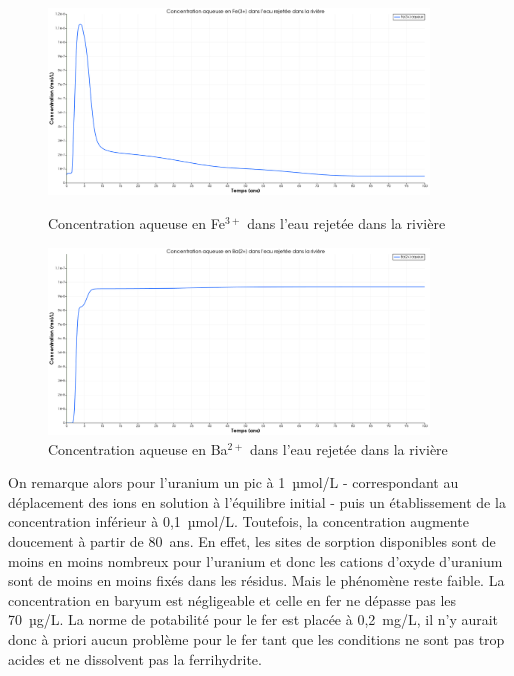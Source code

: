 \documentclass{article}
\begin{document}
\begin{figure}[H]
    \centering
    \begin{minipage}{0.5\textwidth}
        \centering
        \includegraphics[width=0.9\textwidth]{III_B_2_7.png} 
        \caption{Concentration aqueuse en Fe$^{3+}$ dans l'eau rejetée dans la rivière}
        \label{fig:Fe_riviere_sable_Base}
    \end{minipage}\hfill
    \begin{minipage}{0.5\textwidth}
        \centering
        \includegraphics[width=0.9\textwidth]{III_B_2_8.png} 
        \caption{Concentration aqueuse en Ba$^{2+}$ dans l'eau rejetée dans la rivière}
        \label{fig:Ba_riviere_sable_base}
    \end{minipage}
\end{figure}


On remarque alors pour l’uranium un pic à 1~µmol/L - correspondant au déplacement des ions en solution à l’équilibre initial - puis un établissement de la concentration inférieur à 0,1~µmol/L. Toutefois, la concentration augmente doucement à partir de 80~ans. En effet, les sites de sorption disponibles sont de moins en moins nombreux pour l'uranium et donc les cations d’oxyde d’uranium sont de moins en moins fixés dans les résidus. Mais le phénomène reste faible. La concentration en baryum est négligeable et celle en fer ne dépasse pas les 70~µg/L. La norme de potabilité pour le fer est placée à 0,2~mg/L, il n’y aurait donc à priori aucun problème pour le fer tant que les conditions ne sont pas trop acides et ne dissolvent pas la ferrihydrite.
\end{document}
